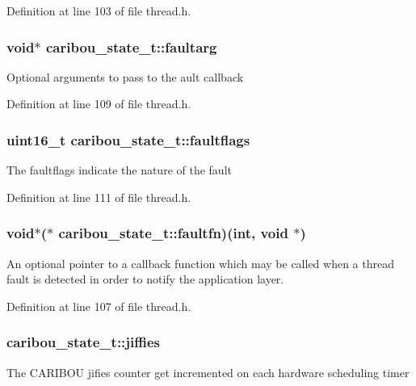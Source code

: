 Definition at line 103 of file thread.\-h.

\hypertarget{structcaribou__state__t_a216a949f12587c830b1a6a032a55e5f6}{
\subsubsection[{faultarg}]{\setlength{\rightskip}{0pt plus 5cm}void$\ast$ caribou\-\_\-state\-\_\-t\-::faultarg}}\label{structcaribou__state__t_a216a949f12587c830b1a6a032a55e5f6}
Optional arguments to pass to the ault callback 

Definition at line 109 of file thread.\-h.

\hypertarget{structcaribou__state__t_addd3bea9a3b8f1c0ce07b9d5d911bcf3}{
\subsubsection[{faultflags}]{\setlength{\rightskip}{0pt plus 5cm}uint16\-\_\-t caribou\-\_\-state\-\_\-t\-::faultflags}}\label{structcaribou__state__t_addd3bea9a3b8f1c0ce07b9d5d911bcf3}
The faultflags indicate the nature of the fault 

Definition at line 111 of file thread.\-h.

\hypertarget{structcaribou__state__t_a74f0e2518d9d8dac1107da05351493a4}{
\subsubsection[{faultfn}]{\setlength{\rightskip}{0pt plus 5cm}void$\ast$($\ast$ caribou\-\_\-state\-\_\-t\-::faultfn)(int, void $\ast$)}}\label{structcaribou__state__t_a74f0e2518d9d8dac1107da05351493a4}
An optional pointer to a callback function which may be called when a thread fault is detected in order to notify the application layer. 

Definition at line 107 of file thread.\-h.

\hypertarget{structcaribou__state__t_a8673fbc4d5b87740ee1b42c88af3278a}{
\subsubsection[{jiffies}]{ caribou\-\_\-state\-\_\-t\-::jiffies}}\label{structcaribou__state__t_a8673fbc4d5b87740ee1b42c88af3278a}
The C\-A\-R\-I\-B\-O\-U jifies counter get incremented on each hardware scheduling timer 

